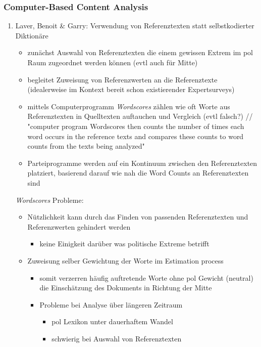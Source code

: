 \documentclass[11pt]{article}
\begin{document}
\subsubsection{Computer-Based Content Analysis}
\label{sec:orgd0f0d1a}
\begin{enumerate}
\item Laver, Benoit \& Garry: Verwendung von Referenztexten statt selbstkodierter Diktionäre
\label{sec:org6c35e06}
\begin{itemize}
\item zunächst Auswahl von Referenztexten die einem gewissen Extrem im pol Raum zugeordnet werden können (evtl auch für Mitte)
\item begleitet Zuweisung von Referenzwerten an die Referenztexte (idealerweise im Kontext bereit schon existierender Expertsurveys)
\item mittels Computerprogramm \emph{Wordscores} zählen wie oft Worte aus Referenztexten in Quelltexten auftauchen und Vergleich (evtl falsch?) // "computer program Wordscores then counts the number of times each word occurs in the reference texts and compares these counts to word counts from the texts being analyzed"
\item Parteiprogramme werden auf ein Kontinuum zwischen den Referenztexten platziert, basierend darauf wie nah die Word Counts an Referenztexten sind
\end{itemize}

\emph{Wordscores} Probleme:
\begin{itemize}
\item Nützlichkeit kann durch das Finden von passenden Referenztexten und Referenzwerten gehindert werden
\begin{itemize}
\item keine Einigkeit darüber was politische Extreme betrifft
\end{itemize}
\item Zuweisung selber Gewichtung der Worte im  Estimation process
\begin{itemize}
\item somit verzerren häufig auftretende Worte ohne pol Gewicht (neutral) die Einschätzung des Dokuments in Richtung der Mitte
\end{itemize}
\begin{itemize}
\item Probleme bei Analyse über längeren Zeitraum
\begin{itemize}
\item pol Lexikon unter dauerhaftem Wandel
\item schwierig bei Auswahl von Referenztexten
\end{itemize}
\end{itemize}
\end{itemize}
\end{enumerate}
\end{document}
